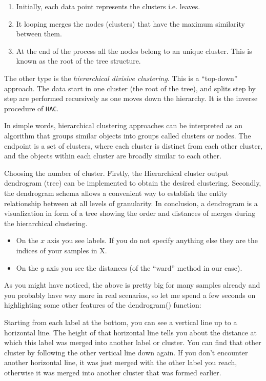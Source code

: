 \documentclass[fleqn,usenatbib]{mnras}
\begin{document}
{\begin{enumerate}
\item Initially, each data point represents the clusters i.e. leaves.
\item It looping merges the nodes (clusters) that have the maximum similarity
  between them.
\item At the end of the process all the nodes belong to an unique cluster. This is
  known as the root of the tree structure.
 \end{enumerate}


The other type is the \textit{hierarchical divisive clustering}. This is a ``top-down''
approach. The data start in one cluster (the root of the tree), and splits step by step
are performed recursively as one moves down the hierarchy. It is the inverse procedure
of \texttt{HAC}.

In simple words, hierarchical clustering approaches can be interpreted  as an
algorithm that groups similar objects into groups called clusters or nodes.
The endpoint is a set of clusters, where each cluster is distinct from each other cluster,
and the objects within each cluster are broadly similar to each other.


Choosing the number of cluster. Firstly, the Hierarchical cluster output dendrogram (tree)
can be implemented to obtain the desired clustering. Secondly, the dendrogram schema allows
a convenient way to establish the entity relationship between at all levels of granularity.
In conclusion, a dendrogram is a visualization in form of a tree showing the order
and distances of merges during the hierarchical clustering.

\begin{itemize}
  
     \item On the $x$ axis you see labels. If you do not specify anything else they
       are the indices of your samples in X.
     \item On the $y$ axis you see the distances (of the ``ward'' method in our case).
       
\end{itemize}



As you might have noticed, the above is pretty big for many samples already and you
probably have way more in real scenarios, so let me spend a few seconds on highlighting
some other features of the dendrogram() function:


Starting from each label at the bottom, you can see a vertical line up to a
horizontal line. The height of that horizontal line tells you about the distance
at which this label was merged into another label or cluster. You can find that
other cluster by following the other vertical line down again. If you don't
encounter another horizontal line, it was just merged with the other label
you reach, otherwise it was merged into another cluster that was formed earlier.

}
\end{document}
